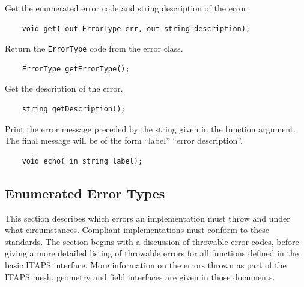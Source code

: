 \documentclass{article}
\begin{document}
Get the enumerated error code and string description of the error.
\begin{verbatim}
    void get( out ErrorType err, out string description);
\end{verbatim} 

Return the {\tt ErrorType} code from the error class.
\begin{verbatim}
    ErrorType getErrorType();
\end{verbatim} 

Get the description of the error.
\begin{verbatim}
    string getDescription();
\end{verbatim} 

Print the error message preceded by the string given in the function 
argument. The final message will be of the form ``label'' ``error 
description''.
\begin{verbatim}
    void echo( in string label);
\end{verbatim} 

\subsection{Enumerated Error Types}

This section describes which errors an implementation must throw 
and under what circumstances. Compliant implementations must 
conform to these standards. The section begins with a discussion 
of throwable error codes, before giving a more detailed listing 
of throwable errors for all functions defined in the basic ITAPS 
interface. More information on the errors thrown as part of the 
ITAPS mesh, geometry and field interfaces are given in those documents.
\end{document}
